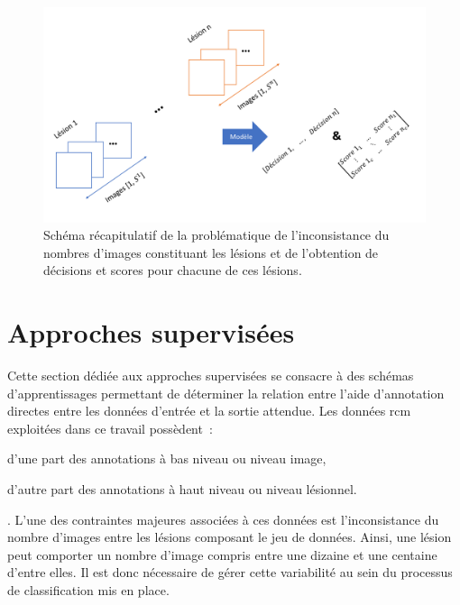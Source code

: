 \begin{figure}[H]
    \centering
    \includegraphics[width=0.75\linewidth]{contents/chapter_6/resources/scheme_patient_decision_objectives.pdf}
    \caption{Schéma récapitulatif de la problématique de l'inconsistance du nombres d'images constituant les lésions et de l'obtention de décisions et scores pour chacune de ces lésions.}
    \label{fig:scheme_patient_decision_objectives}
\end{figure}\par
\clearpage

\section{Approches supervisées}
\label{sec:patient_decision_supervised}
Cette section dédiée aux approches supervisées se consacre à des schémas d'apprentissages permettant de déterminer la relation entre l'aide d'annotation directes entre les données d'entrée et la sortie attendue. Les données \gls{rcm} exploitées dans ce travail possèdent~:
\begin{inlinerate}
    \item d'une part des annotations à bas niveau ou niveau image,
    \item d'autre part des annotations à haut niveau ou niveau lésionnel. 
\end{inlinerate}. L'une des contraintes majeures associées à ces données est l'inconsistance du nombre d'images entre les lésions composant le jeu de données. Ainsi, une lésion peut comporter un nombre d'image compris entre une dizaine et une centaine d'entre elles. Il est donc nécessaire de gérer cette variabilité au sein du processus de classification mis en place.\par

